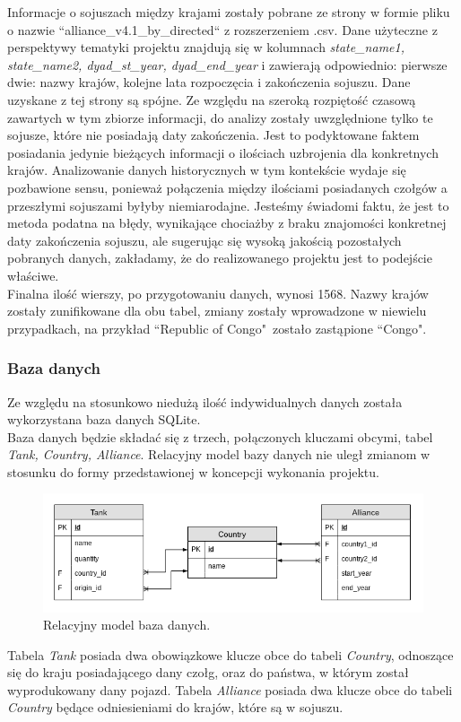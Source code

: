 \indent Informacje o sojuszach między krajami zostały pobrane ze strony\cite{alliance} w formie pliku o nazwie ``alliance\_v4.1\_by\_directed`` z rozszerzeniem .csv. Dane użyteczne z perspektywy tematyki projektu znajdują się w kolumnach \textit{state\_name1, state\_name2, dyad\_st\_year, dyad\_end\_year} i zawierają odpowiednio: pierwsze dwie: nazwy krajów, kolejne lata rozpoczęcia i zakończenia sojuszu. Dane uzyskane z tej strony są spójne. Ze względu na szeroką rozpiętość czasową zawartych w tym zbiorze informacji, do analizy zostały uwzględnione tylko te sojusze, które nie posiadają daty zakończenia. Jest to podyktowane faktem posiadania jedynie bieżących informacji o ilościach uzbrojenia dla konkretnych krajów. Analizowanie danych historycznych w tym kontekście wydaje się pozbawione sensu, ponieważ połączenia między ilościami posiadanych czołgów a przeszłymi sojuszami byłyby niemiarodajne. Jesteśmy świadomi faktu, że jest to metoda podatna na błędy, wynikające chociażby z braku znajomości konkretnej daty zakończenia sojuszu, ale sugerując się wysoką jakością pozostałych pobranych danych, zakładamy, że do realizowanego projektu jest to podejście właściwe.\\
Finalna ilość wierszy, po przygotowaniu danych, wynosi 1568.
Nazwy krajów zostały zunifikowane dla obu tabel, zmiany zostały wprowadzone w niewielu przypadkach, na przykład ``Republic of Congo"\ zostało zastąpione  ``Congo".

\subsubsection{Baza danych}
Ze względu na stosunkowo niedużą ilość indywidualnych danych została wykorzystana baza danych SQLite.\\
Baza danych będzie składać się z trzech, połączonych kluczami obcymi, tabel \textit{Tank, Country, Alliance}.
Relacyjny model bazy danych nie uległ zmianom w stosunku do formy przedstawionej w koncepcji wykonania projektu.
\begin{figure}[H]
    \centering \includegraphics[width=0.8\linewidth]{tex/relacyjna_baza_danych.png}
    \caption{Relacyjny model baza danych.}
    \label{fig:rel_model}
\end{figure}
Tabela \textit{Tank} posiada dwa obowiązkowe klucze obce do tabeli \textit{Country}, odnoszące się do kraju posiadającego dany czołg, oraz do państwa, w którym został wyprodukowany dany pojazd.
Tabela \textit{Alliance} posiada dwa klucze obce do tabeli \textit{Country} będące odniesieniami do krajów, które są w sojuszu. 
